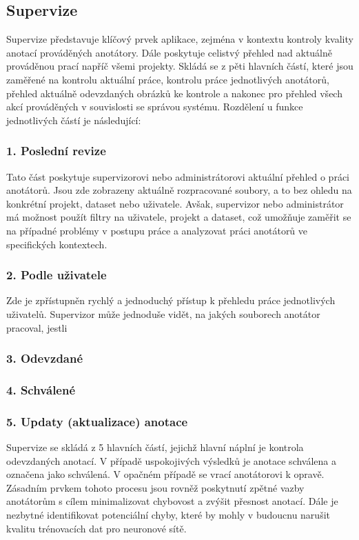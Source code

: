 \subsection{Supervize}

Supervize představuje klíčový prvek aplikace, zejména v kontextu kontroly kvality anotací prováděných anotátory. Dále poskytuje celistvý přehled nad aktuálně prováděnou prací napříč všemi projekty. Skládá se z pěti hlavních částí, které jsou zaměřené na kontrolu aktuální práce, kontrolu práce jednotlivých anotátorů, přehled aktuálně odevzdaných obrázků ke kontrole a nakonec pro přehled všech akcí prováděných v souvislosti se správou systému. Rozdělení u funkce jednotlivých částí je následující:

\subsubsection{1. Poslední revize}

Tato část poskytuje supervizorovi nebo administrátorovi aktuální přehled o práci anotátorů. Jsou zde zobrazeny aktuálně rozpracované soubory, a to bez ohledu na konkrétní projekt, dataset nebo uživatele. Avšak, supervizor nebo administrátor má možnost použít filtry na uživatele, projekt a dataset, což umožňuje zaměřit se na případné problémy v postupu práce a analyzovat práci anotátorů ve specifických kontextech.

\subsubsection{2. Podle uživatele}
Zde je zpřístupněn rychlý a jednoduchý přístup k přehledu práce jednotlivých uživatelů. Supervizor může jednoduše vidět, na jakých souborech anotátor pracoval, jestli 

\subsubsection{3. Odevzdané}


\subsubsection{4. Schválené}
\subsubsection{5. Updaty (aktualizace) anotace}


Supervize se skládá z 5 hlavních částí, jejichž hlavní náplní je kontrola odevzdaných anotací. V případě uspokojivých výsledků je anotace schválena a označena jako schválená. V opačném případě se vrací anotátorovi k opravě. Zásadním prvkem tohoto procesu jsou rovněž poskytnutí zpětné vazby anotátorům s cílem minimalizovat chybovost a zvýšit přesnost anotací. Dále je nezbytné identifikovat potenciální chyby, které by mohly v budoucnu narušit kvalitu trénovacích dat pro neuronové sítě.

